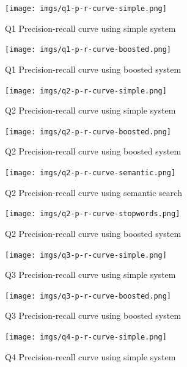 \documentclass[sigconf]{acmart}
\begin{document}
\begin{figure}[H]
  \centering
  \texttt{[image: imgs/q1-p-r-curve-simple.png]}
  \caption{Q1 Precision-recall curve using simple system}
  \label{fig:q1_simple}
\end{figure}

\begin{figure}[H]
  \centering
  \texttt{[image: imgs/q1-p-r-curve-boosted.png]}
  \caption{Q1 Precision-recall curve using boosted system}
  \label{fig:q1_boosted}
\end{figure}


\begin{figure}[H]
  \centering
  \texttt{[image: imgs/q2-p-r-curve-simple.png]}
  \caption{Q2 Precision-recall curve using simple system}
  \label{fig:q2_simple}
\end{figure}

\begin{figure}[H]
  \centering
  \texttt{[image: imgs/q2-p-r-curve-boosted.png]}
  \caption{Q2 Precision-recall curve using boosted system}
  \label{fig:q2_boosted}
\end{figure}

\begin{figure}[H]
  \centering
  \texttt{[image: imgs/q2-p-r-curve-semantic.png]}
  \caption{Q2 Precision-recall curve using semantic search}
  \label{fig:q2_semantic}
\end{figure}

\begin{figure}[H]
  \centering
  \texttt{[image: imgs/q2-p-r-curve-stopwords.png]}
  \caption{Q2 Precision-recall curve using boosted system}
  \label{fig:q2_stopwords}
\end{figure}



\begin{figure}[H]
  \centering
  \texttt{[image: imgs/q3-p-r-curve-simple.png]}
  \caption{Q3 Precision-recall curve using simple system}
  \label{fig:q3_simple}
\end{figure}

\begin{figure}[H]
  \centering
  \texttt{[image: imgs/q3-p-r-curve-boosted.png]}
  \caption{Q3 Precision-recall curve using boosted system}
  \label{fig:q3_boosted}
\end{figure}

\begin{figure}[H]
  \centering
  \texttt{[image: imgs/q4-p-r-curve-simple.png]}
  \caption{Q4 Precision-recall curve using simple system}
  \label{fig:q4_simple}
\end{figure}
\end{document}
